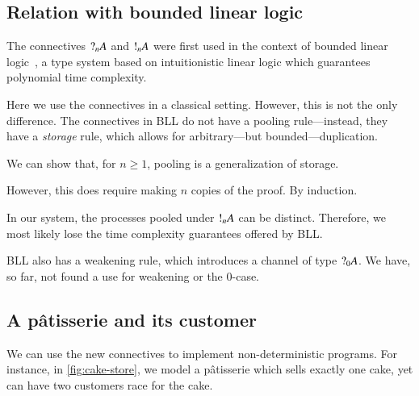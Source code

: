 \documentclass[twocolumn]{article}
\begin{document}

\subsection{Relation with bounded linear logic}
The connectives $\give[n]{A}$ and $\take[n]{A}$ were first used in the context
of bounded linear logic~\citep[BLL;][]{girard1992}, a type system based on
intuitionistic linear logic which guarantees polynomial time complexity.

Here we use the connectives in a classical setting.
However, this is not the only difference.
The connectives in BLL do not have a pooling rule---instead, they have a
\emph{storage} rule, which allows for arbitrary---but bounded---duplication.
\begin{center}
  \begin{proofbox}
  \end{proofbox}
\end{center}
We can show that, for $n \geq 1$, pooling is a generalization of
storage.

However, this does require making $n$ copies of the proof.
By induction.
\begin{proofblock}
  \noLine
  \UIC{$\vphantom{!}\smash[t]{\vdots}$}
  \noLine
  \noLine
  \UIC{$\vphantom{!}\smash[t]{\vdots}$}
  \noLine
\end{proofblock}
In our system, the processes pooled under $\take[n]{A}$ can be distinct.
Therefore, we most likely lose the time complexity guarantees offered by BLL.

BLL also has a weakening rule, which introduces a channel of type $\give[0]{A}$.
We have, so far, not found a use for weakening or the $0$-case. 

\subsection{A p\^{a}tisserie and its customer}
We can use the new connectives to implement non-deterministic programs.
For instance, in \autoref{fig:cake-store}, we model a p\^{a}tisserie which sells
exactly one cake, yet can have two customers race for the cake.
\end{document}
